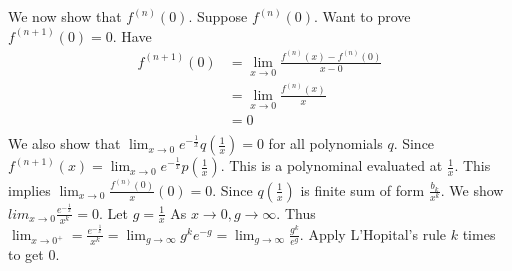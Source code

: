 \documentclass{article}
\begin{document}
\begin{example}
          We now show that $f^{(n)}(0)$. Suppose $f^{(n)}(0)$. Want to prove $f^{(n+1)}(0) = 0$. Have
          \begin{align*}
            f^{(n+1)}(0) &= \lim_{x\to0} \frac{f^{(n)}(x) - f^{(n)}(0)}{x-0}\\
            &= \lim_{x\to0}\frac{f^{(n)}(x)}{x}\\
            &= 0\\
          \end{align*}
          We also show that $\lim_{x\to0} e^{-\frac{1}{x}}q(\frac{1}{x}) = 0$ for all polynomials $q$. Since $f^{(n+1)}(x) = \lim_{x\to0} e^{-\frac{1}{x}}p(\frac{1}{x})$. This is a polynominal evaluated at $\frac{1}{x}$. This implies $\lim_{x\to0}\frac{f^{(n)}(0)}{x}(0) = 0$. Since $q(\frac{1}{x})$ is finite sum of form $\frac{b_k}{x^k}$. We show $lim_{x\to0} \frac{e^{-\frac{1}{x}}}{x^k} = 0$. Let $g = \frac{1}{x}$ As $x \to 0, g \to \infty$. Thus $\lim_{x\to0^+} = \frac{e^{-\frac{1}{x}}}{x^k} = \lim_{g\to\infty} g^ke^{-g} = \lim_{g\to\infty} \frac{g^k}{e^g}$. Apply L'Hopital's rule $k$ times to get $0$.
        \end{example}
        
\end{document}
